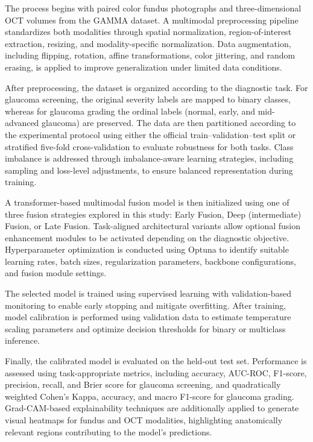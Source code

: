 \documentclass[preprint,12pt]{elsarticle}
\begin{document}
The process begins with paired color fundus photographs and three-dimensional OCT volumes from the GAMMA dataset. A multimodal preprocessing pipeline standardizes both modalities through spatial normalization, region-of-interest extraction, resizing, and modality-specific normalization. Data augmentation, including flipping, rotation, affine transformations, color jittering, and random erasing, is applied to improve generalization under limited data conditions.

After preprocessing, the dataset is organized according to the diagnostic task. For glaucoma screening, the original severity labels are mapped to binary classes, whereas for glaucoma grading the ordinal labels (normal, early, and mid-advanced glaucoma) are preserved. The data are then partitioned according to the experimental protocol using either the official train–validation–test split or stratified five-fold cross-validation to evaluate robustness for both tasks. Class imbalance is addressed through imbalance-aware learning strategies, including sampling and loss-level adjustments, to ensure balanced representation during training.

A transformer-based multimodal fusion model is then initialized using one of three fusion strategies explored in this study: Early Fusion, Deep (intermediate) Fusion, or Late Fusion. Task-aligned architectural variants allow optional fusion enhancement modules to be activated depending on the diagnostic objective. Hyperparameter optimization is conducted using Optuna to identify suitable learning rates, batch sizes, regularization parameters, backbone configurations, and fusion module settings.

The selected model is trained using supervised learning with validation-based monitoring to enable early stopping and mitigate overfitting. After training, model calibration is performed using validation data to estimate temperature scaling parameters and optimize decision thresholds for binary or multiclass inference.

Finally, the calibrated model is evaluated on the held-out test set. Performance is assessed using task-appropriate metrics, including accuracy, AUC-ROC, F1-score, precision, recall, and Brier score for glaucoma screening, and quadratically weighted Cohen's Kappa, accuracy, and macro F1-score for glaucoma grading. Grad-CAM-based explainability techniques are additionally applied to generate visual heatmaps for fundus and OCT modalities, highlighting anatomically relevant regions contributing to the model’s predictions.
\end{document}
